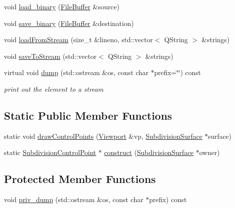 \begin{DoxyCompactItemize}
\item 
void \hyperlink{classShipCAD_1_1SubdivisionControlPoint_a989c801ca1c836ca73f77c68d719f546}{load\-\_\-binary} (\hyperlink{classShipCAD_1_1FileBuffer}{File\-Buffer} \&source)
\item 
void \hyperlink{classShipCAD_1_1SubdivisionControlPoint_a7de1a32ae9e845478ec1bd5eaec17cd1}{save\-\_\-binary} (\hyperlink{classShipCAD_1_1FileBuffer}{File\-Buffer} \&destination)
\item 
void \hyperlink{classShipCAD_1_1SubdivisionControlPoint_a09769bfb0b63980387c23736081acdf1}{load\-From\-Stream} (size\-\_\-t \&lineno, std\-::vector$<$ Q\-String $>$ \&strings)
\item 
void \hyperlink{classShipCAD_1_1SubdivisionControlPoint_a60cc866bff57473700fbea4e17adcb4d}{save\-To\-Stream} (std\-::vector$<$ Q\-String $>$ \&strings)
\item 
virtual void \hyperlink{classShipCAD_1_1SubdivisionControlPoint_a4a9d6e45291c27f19f0d76c9b9d19048}{dump} (std\-::ostream \&os, const char $\ast$prefix=\char`\"{}\char`\"{}) const 
\begin{DoxyCompactList}\small\item\em print out the element to a stream \end{DoxyCompactList}\end{DoxyCompactItemize}
\subsection*{Static Public Member Functions}
\begin{DoxyCompactItemize}
\item 
static void \hyperlink{classShipCAD_1_1SubdivisionControlPoint_a761599371138b34be2c7a2cac3699e2c}{draw\-Control\-Points} (\hyperlink{classShipCAD_1_1Viewport}{Viewport} \&vp, \hyperlink{classShipCAD_1_1SubdivisionSurface}{Subdivision\-Surface} $\ast$surface)
\item 
static \hyperlink{classShipCAD_1_1SubdivisionControlPoint}{Subdivision\-Control\-Point} $\ast$ \hyperlink{classShipCAD_1_1SubdivisionControlPoint_adc189f3e5cff85ecd1a59356e0f7d63d}{construct} (\hyperlink{classShipCAD_1_1SubdivisionSurface}{Subdivision\-Surface} $\ast$owner)
\end{DoxyCompactItemize}
\subsection*{Protected Member Functions}
\begin{DoxyCompactItemize}
\item 
void \hyperlink{classShipCAD_1_1SubdivisionControlPoint_a01e1eff38ecb4393948db0d9883cad84}{priv\-\_\-dump} (std\-::ostream \&os, const char $\ast$prefix) const 
\end{DoxyCompactItemize}
